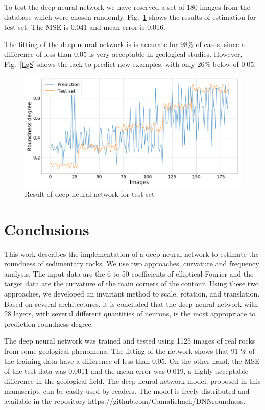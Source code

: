 \documentclass[conference]{IEEEtran}
\begin{document}
To test the deep neural network we have reserved a set of 180 images from the database which were chosen randomly. Fig.~\ref{fig9} shows the results of estimation for test set. The MSE is 0.041 and mean error is 0.016.


The fitting of the deep neural network is  is accurate for 98\% of cases, since a difference of less than 0.05 is very acceptable in geological studies. However, Fig.~\ref{fig8} shows the lack to predict new examples, with only 26\% below of 0.05.

\begin{figure}[htbp]
\centerline{\includegraphics[scale=0.3]{fig9.png}}
\caption{Result of deep neural network for test set}
\label{fig9}
\end{figure}

\section{Conclusions}
This work describes the implementation of a deep neural network to estimate the roundness of sedimentary rocks. We use two approaches, curvature and frequency analysis. The input data are the 6 to 50 coefficients of elliptical Fourier and the target data are the curvature of the main corners of the contour. Using these two approaches, we developed an invariant method to scale, rotation, and translation. Based on several architectures, it is concluded that the deep neural network with 28 layers, with several different quantities of neurons, is the most appropriate to prediction roundness degree. 

The deep neural network was trained and tested using 1125 images of real rocks from some geological phenomena. The fitting of the network shows that 91 \% of the training data have a difference of less than 0.05. On the other hand, the MSE of the test data was 0.0011 and the mean error was 0.019, a highly acceptable difference in the geological field. The deep neural network model, proposed in this manuscript, can be easily used by readers. The model is freely distributed and available in the repository https://github.com/Gamalielmch/DNN\textunderscore roundness.
\end{document}
